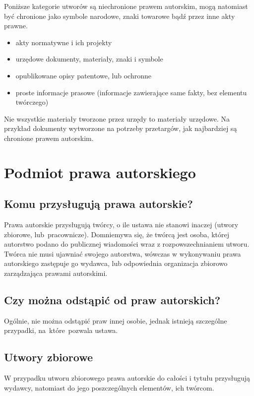\documentclass{article}
\begin{document}
Poniższe kategorie utworów są niechronione prawem autorskim,
mogą natomiast być chronione jako symbole narodowe, znaki towarowe bądź przez inne akty prawne.

\begin{itemize}
  \item akty normatywne i ich projekty
  \item urzędowe dokumenty, materiały, znaki i symbole
  \item opublikowane opisy patentowe, lub ochronne
  \item proste informacje prasowe (informacje zawierające same fakty, bez elementu twórczego)
\end{itemize}

Nie wszystkie materiały tworzone przez urzędy to materiały urzędowe.
Na przykład dokumenty wytworzone na potrzeby przetargów, jak najbardziej są chronione prawem autorskim.

\section{Podmiot prawa autorskiego}

\subsection{Komu przysługują prawa autorskie?}

Prawa autorskie przysługują twórcy, o ile ustawa nie stanowi inaczej (utwory zbiorowe, lub~pracownicze).
Domniemywa się, że twórcą jest osoba, której autorstwo podano do publicznej wiadomości wraz z rozpowszechnianiem utworu.
Twórca nie musi ujawniać swojego autorstwa, wówczas w wykonywaniu prawa autorskiego zastępuje go wydawca, lub odpowiednia organizacja zbiorowo zarządzająca prawami autorskimi.

\subsection{Czy można odstąpić od praw autorskich?}

Ogólnie, nie można odstąpić praw innej osobie, jednak istnieją szczególne przypadki, na~które~pozwala ustawa.

\subsection{Utwory zbiorowe}

W przypadku utworu zbiorowego prawa autorskie do całości i tytułu przysługują wydawcy, natomiast do jego poszczególnych elementów, ich twórcom.
\end{document}
